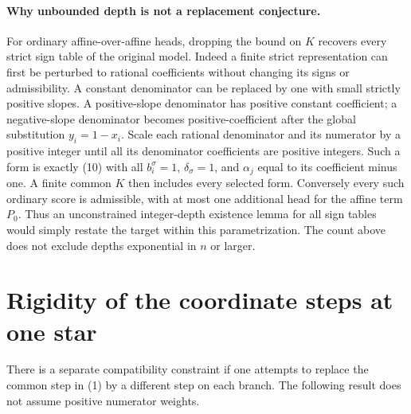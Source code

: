 \documentclass[11pt]{article}
\begin{document}
\paragraph{Why unbounded depth is not a replacement conjecture.}
For ordinary affine-over-affine heads, dropping the bound on $K$
recovers every strict sign table of the original model. Indeed a
finite strict representation can first be perturbed to rational
coefficients without changing its signs or admissibility. A
constant denominator can be replaced by one with small strictly
positive slopes. A positive-slope denominator has positive constant
coefficient; a negative-slope denominator becomes positive-coefficient
after the global substitution $y_i=1-x_i$. Scale each rational
denominator and its numerator by a positive integer until all its
denominator coefficients are positive integers. Such a form is
exactly (10) with all $b_i^\sigma=1$, $\delta_\sigma=1$, and
$\alpha_j$ equal to its coefficient minus one. A finite common $K$
then includes every selected form. Conversely every such ordinary
score is admissible, with at most one additional head for the affine
term $P_0$. Thus an unconstrained integer-depth existence
lemma for all sign tables would simply restate the target within
this parametrization. The count above does not exclude depths
exponential in $n$ or larger.

\section{Rigidity of the coordinate steps at one star}

There is a separate compatibility constraint if one attempts to
replace the common step in (1) by a different step on each branch.
The following result does not assume positive numerator weights.
\end{document}
